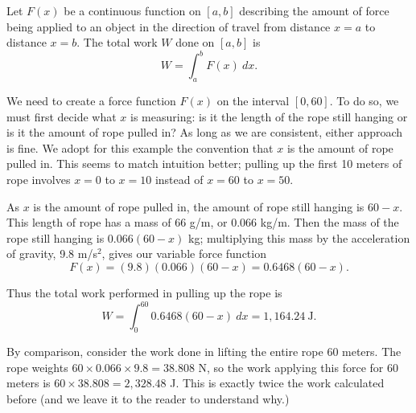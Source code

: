 {Let $F(x)$ be a continuous function on $[a,b]$ describing the amount of force being applied to an object in the direction of travel from distance $x=a$ to distance $x=b$. The total work $W$ done on $[a,b]$ is
$$W = \int_a^b F(x)\ dx.$$
}
\clearpage
{}
{We need to create a force function $F(x)$ on the interval $[0,60]$. To do so, we must first decide what $x$ is measuring: is it the length of the rope still hanging or is it the amount of rope pulled in? As long as we are consistent, either approach is fine. We adopt for this example the convention that $x$ is the amount of rope pulled in. This seems to match intuition better; pulling up the first 10 meters of rope involves $x=0$ to $x=10$ instead of $x=60$ to $x=50$. 

As $x$ is the amount of rope pulled in, the amount of rope still hanging is $60-x$. This length of rope has a mass of 66 g/m, or $0.066$ kg/m. Then the mass of the rope still hanging is $0.066(60-x)$ kg; multiplying this mass by the acceleration of gravity, 9.8 m/s$^2$, gives our variable force function $$F(x) = (9.8)(0.066)(60-x) = 0.6468(60-x).$$

Thus the total work performed in pulling up the rope is 
$$W = \int_0^{60} 0.6468(60-x)\ dx = 1,164.24\ \text{J}.$$

By comparison, consider the work done in lifting the entire rope 60 meters. The rope weights $60\times 0.066 \times 9.8 = 38.808$ N, so the work applying this force for 60 meters is $60\times 38.808 = 2,328.48$ J. This is exactly twice the work calculated before (and we leave it to the reader to understand why.)
}\\

